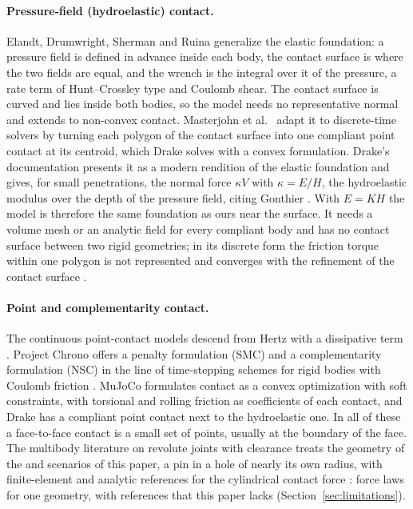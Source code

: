 \paragraph{Pressure-field (hydroelastic) contact.} Elandt, Drumwright, Sherman and Ruina
\cite{Elandt2019} generalize the elastic foundation: a pressure field is defined in advance
inside each body, the contact surface is where the two fields are equal, and the wrench is the
integral over it of the pressure, a rate term of Hunt--Crossley type and Coulomb shear. The
contact surface is curved and lies inside both bodies, so the model needs no representative
normal and extends to non-convex contact. Masterjohn et al.~\cite{Masterjohn2022} adapt it to
discrete-time solvers by turning each polygon of the contact surface into one compliant point
contact at its centroid, which Drake solves with a convex formulation.
Drake's documentation presents it as a modern rendition of the elastic foundation and gives,
for small penetrations, the normal force $\kappa V$ with $\kappa = E/H$, the hydroelastic
modulus over the depth of the pressure field, citing Gonthier \cite{DrakeHydroParams}. With
$E = K H$ the model is therefore the same foundation as ours near the surface. It needs a
volume mesh or an analytic field for every compliant body and has no contact surface between
two rigid geometries; in its discrete form the friction torque within one polygon is not
represented and converges with the refinement of the contact surface \cite{DrakeHydroGuide}.

\paragraph{Point and complementarity contact.} The continuous point-contact models descend
from Hertz \cite{Hertz1882} with a dissipative term \cite{HuntCrossley1975}.
Project Chrono \cite{Tasora2016} offers a penalty formulation (SMC) and a complementarity
formulation (NSC) in the line of time-stepping schemes for rigid bodies with Coulomb friction
\cite{Stewart1996,Anitescu1997}. MuJoCo \cite{Todorov2012,Todorov2014} formulates contact as a
convex optimization with soft constraints, with torsional and rolling friction as coefficients
of each contact, and Drake has a compliant point contact next to the hydroelastic one. In all
of these a face-to-face contact is a small set of points, usually at the boundary of the face.
The multibody literature on revolute joints with clearance treats the geometry of the
 and  scenarios of this paper, a pin in a hole of nearly its own
radius, with finite-element and analytic references for the cylindrical contact force
\cite{Liu2007,Pereira2011,Pereira2015}: force laws for one geometry, with references that this
paper lacks (Section~\ref{sec:limitations}).

